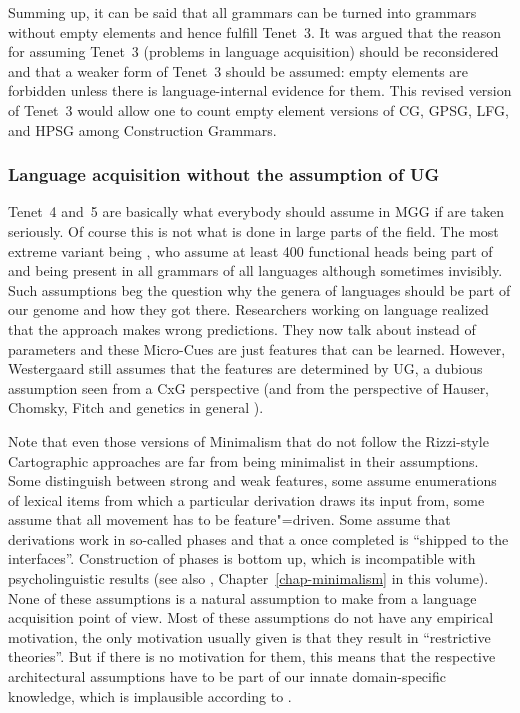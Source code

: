 \documentclass[output=paper]{langsci/langscibook}
\begin{document}
Summing up, it can be said that all grammars can be turned into grammars without empty elements and
hence fulfill Tenet~3. It was argued that the reason for assuming Tenet~3 (problems in language
acquisition) should be reconsidered and that a weaker form of Tenet~3 should be assumed: empty
elements are forbidden unless there is language-internal evidence for them. This revised version of
Tenet~3 would allow one to count empty element versions of CG, GPSG, LFG, and HPSG among Construction Grammars.



\subsubsection{Language acquisition without the assumption of UG}

Tenet~4 and~5 are basically what everybody should assume in MGG if \citet*{HCF2002a} are taken seriously. Of
course this is not what is done in large parts of the field. The most extreme variant being
\citet{CR2010a}, who assume at least 400 functional heads being part of  and being present in all grammars of all languages although sometimes
invisibly. Such assumptions beg the question why the genera of  languages should be part of our
genome and how they got there. 
Researchers working on language  realized that the 
approach \citep{Meisel95a} makes wrong predictions. They now talk about  instead of
parameters \citep{Westergaard2014a} and these Micro-Cues are just features that can be
learned. However, Westergaard still assumes that the features are determined by UG, a dubious
assumption seen from a CxG perspective (and from the perspective of Hauser, Chomsky, Fitch and
genetics in general \citep{Bishop2002a}).

Note that even those versions of Minimalism that do not follow the Rizzi-style Cartographic
approaches are far from being minimalist in their assumptions. Some distinguish between strong
and weak features, some assume enumerations of lexical items from which a particular derivation
draws its input from, some assume that all movement has to be feature"=driven. Some assume that
derivations work in so-called phases and that a  once completed is ``shipped to the
interfaces''. Construction of phases is bottom up, which is incompatible with psycholinguistic
results (see also \citealt[Section~\ref{sec-minimalism-processing}]{chapters/minimalism}, Chapter~\ref{chap-minimalism} in this
volume). None of these assumptions is a natural assumption to make from a
language acquisition point of view. Most of these assumptions do not have any empirical motivation, the
only motivation usually given is that they result in ``restrictive theories''. But if there is no
motivation for them, this means that the respective architectural assumptions have to be part of our
innate domain-specific knowledge, which is implausible according to \citet*{HCF2002a}.
\end{document}
